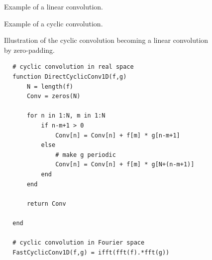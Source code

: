 \begin{figure}
    \centering
    
    \caption{Example of a linear convolution.}
    \label{fig:linear_convolution}
\end{figure}

\begin{figure}
    \centering
    
    \caption{Example of a cyclic convolution.}
    \label{fig:cyclic_convolution}
\end{figure}

\begin{figure}
    \centering
    
    \caption{Illustration of the cyclic convolution becoming a linear convolution
    by zero-padding.}
    \label{fig:cyclic_linear_convolution}
\end{figure}


\begin{codebox}[!htb]
    \begin{verbatim}
        # cyclic convolution in real space
        function DirectCyclicConv1D(f,g)
            N = length(f)
            Conv = zeros(N)  

            for n in 1:N, m in 1:N
                if n-m+1 > 0
                    Conv[n] = Conv[n] + f[m] * g[n-m+1]
                else
                    # make g periodic
                    Conv[n] = Conv[n] + f[m] * g[N+(n-m+1)]
                end
            end

            return Conv

        end

        # cyclic convolution in Fourier space
        FastCyclicConv1D(f,g) = ifft(fft(f).*fft(g))
    \end{verbatim}
    \caption{Cyclic convolution in Julia.}
    \label{code:cyclic_convolution}
\end{codebox}

